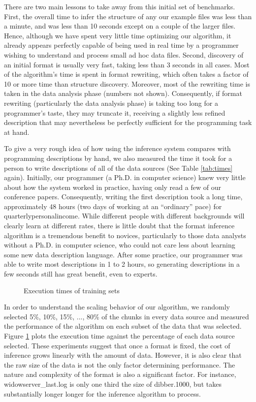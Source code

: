 There are two main lessons to take away from this initial set of
benchmarks.  First, the overall time to infer the structure of any our
example files was less than a minute, and was less than 10 seconds
except on a couple of the larger files.  Hence, although we have spent
very little time optimizing our algorithm, it already appears
perfectly capable of being used in real time by a programmer wishing
to understand and process small ad hoc data files.  Second, discovery
of an initial format is usually very fast, taking less than 3 seconds
in all cases.  Most of the algorithm's time is spent in format rewriting, which
often takes a factor of 10 or more time than structure discovery.  Moreover, most of the
rewriting time is taken in the data analysis phase (numbers not
shown).  Consequently, if format rewriting (particularly the data analysis phase)
is taking too long for a programmer's taste, they may truncate it, receiving a 
slightly less refined description that may nevertheless be perfectly sufficient
for the programming task at hand.

To give a very rough idea of how using the inference system compares with programming
descriptions by hand, we also measured the time it took for a person to write descriptions of
all of the data sources (See Table \ref{tab:times} again).  
Initially, our programmer (a Ph.D. in computer science)
knew very little about how the \pads{} system
worked in practice, having only read a few of our conference papers.  Consequently, writing
the first description took a long time, approximately 48 hours (two days of working at
an ``ordinary'' pace) for quarterlypersonalincome.  While different people with different 
backgrounds will clearly learn at different rates, there is little doubt that the
format inference algorithm is a tremendous benefit to novices, particularly
to those data analysts without a Ph.D. in computer science, who could not care less about
learning some new data description language.  After some practice, our programmer was
able to write most descriptions in 1 to 2 hours, so generating descriptions in a few
seconds still has great benefit, even to experts.

\begin{figure}
\caption{Execution times of training sets} \label{fig:traintime}
\end{figure}

In order to understand the scaling behavior of our algorithm, we
randomly selected 5\%, 10\%, 15\%, ..., 80\% of the chunks in every data source
and measured the performance of the algorithm on each subset of the data that was
selected. Figure \ref{fig:traintime}
plots the execution time against the percentage of each data source selected.
These experiments suggest that once a format is fixed, the cost of inference
grows linearly with the amount of data.  However, it is also clear that the raw
size of the data is not the only factor determining performance.  The nature and complexity
of the format is also a significant factor.  For instance, widowserver\_last.log
is only one third the size of dibber.1000, but takes substantially longer longer
for the inference algorithm to process.

